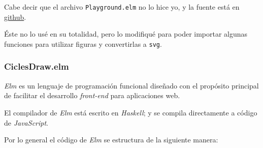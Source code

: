 \documentclass[12pt]{article}
\begin{document}
Cabe decir que el archivo \texttt{Playground.elm} no lo hice yo, y la fuente está en \href{https://github.com/evancz/elm-playground/tree/master}{github}.

Éste no lo usé en su totalidad, pero lo modifiqué para poder importar algunas funciones para utilizar figuras y convertirlas a \texttt{svg}.

\subsubsection*{CiclesDraw.elm}

\textit{Elm} es un lenguaje de programación funcional diseñado con el propósito principal de facilitar el desarrollo \textit{front-end} para aplicaciones web.

El compilador de \textit{Elm} está escrito en \textit{Haskell}; y se compila directamente a código de \textit{JavaScript}.

Por lo general el código de \textit{Elm} se estructura de la siguiente manera:
\end{document}
